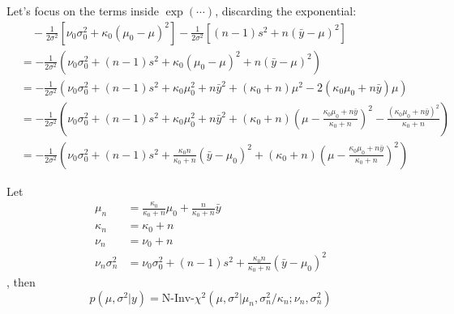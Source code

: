 \documentclass{article}
\begin{document}
\begin{itemize}
Let's focus on the terms inside $\exp (\cdots)$, discarding the exponential:
\begin{align*}
&\quad -\frac{1}{2\sigma^2} [\nu_0 \sigma_0^2 + \kappa_0 (\mu_0 - \mu)^2] -\frac{1}{2\sigma^2}[(n-1)s^2 + n (\bar y - \mu)^2] \\
&= -\frac{1}{2\sigma^2} \left ( \nu_0\sigma_0^2 + (n-1)s^2 + \kappa_0 (\mu_0 - \mu)^2 + n (\bar y - \mu)^2 \right) \\
&= -\frac{1}{2\sigma^2} \left ( \nu_0\sigma_0^2 + (n-1)s^2  + \kappa_0 \mu_0^2 + n {\bar y}^2 + (\kappa_0 + n) \mu^2 - 2(\kappa_0 \mu_0 + n \bar y) \mu \right ) \\
&= -\frac{1}{2\sigma^2} \left ( \nu_0\sigma_0^2 + (n-1)s^2  + \kappa_0 \mu_0^2 + n {\bar y}^2 + (\kappa_0 + n) \left( \mu - \frac{\kappa_0 \mu_0 + n \bar y}{\kappa_0 + n} \right) ^2  - \frac{(\kappa_0 \mu_0 + n \bar y)^2}{\kappa_0 + n}\right ) \\
&= -\frac{1}{2\sigma^2} \left ( \nu_0\sigma_0^2 + (n-1)s^2  + \frac{\kappa_0 n}{\kappa_0 + n} (\bar y - \mu_0)^2  +  (\kappa_0 + n) \left( \mu - \frac{\kappa_0 \mu_0 + n \bar y}{\kappa_0 + n} \right) ^2 \right)
\end{align*}

Let 
\begin{align*}
\mu_n &= \frac{\kappa_0}{\kappa_0 + n} \mu_0 + \frac{n}{\kappa_0 + n} \bar y  \\
\kappa_n &= \kappa_0 + n \\
\nu_n &= \nu_0 + n \\
\nu_n \sigma_n^2 &= \nu_0\sigma_0^2 + (n-1)s^2  + \frac{\kappa_0 n}{\kappa_0 + n} (\bar y - \mu_0)^2
\end{align*}
, then
$$
p(\mu, \sigma^2 | y) = \text{N-Inv-} \chi^2 (\mu, \sigma^2 | \mu_n, \sigma_n^2 / \kappa_n; \nu_n, \sigma_n^2)
$$



\end{itemize}
\end{document}
